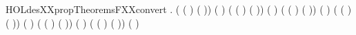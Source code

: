 \begin{SaveVerbatim}{HOLdesXXpropTheoremsFXXconvert}
\HOLTokenTurnstile{} \HOLSymConst{\HOLTokenForall{}} .
        \HOLSymConst{=}
     \HOLTokenLeftbrace{} \HOLTokenBar{}   \HOLSymConst{\HOLTokenEor{}}  ( \HOLSymConst{\HOLTokenEor{}} ( \HOLSymConst{\HOLTokenExtract{}} ) ( )) \HOLSymConst{=} ( \HOLSymConst{\HOLTokenExtract{}} ) \HOLTokenRightbrace{} \HOLConst{\ensuremath{\times}}
     \HOLTokenLeftbrace{} \HOLTokenBar{}   \HOLSymConst{\HOLTokenEor{}}  ( \HOLSymConst{\HOLTokenEor{}} ( \HOLSymConst{\HOLTokenExtract{}} ) ( )) \HOLSymConst{=} ( \HOLSymConst{\HOLTokenExtract{}} ) \HOLTokenRightbrace{} \HOLConst{\ensuremath{\times}}
     \HOLTokenLeftbrace{} \HOLTokenBar{}   \HOLSymConst{\HOLTokenEor{}}  ( \HOLSymConst{\HOLTokenEor{}} ( \HOLSymConst{\HOLTokenExtract{}} ) ( )) \HOLSymConst{=} ( \HOLSymConst{\HOLTokenExtract{}} ) \HOLTokenRightbrace{} \HOLConst{\ensuremath{\times}}
     \HOLTokenLeftbrace{} \HOLTokenBar{}   \HOLSymConst{\HOLTokenEor{}}  ( \HOLSymConst{\HOLTokenEor{}} ( \HOLSymConst{\HOLTokenExtract{}} ) ( )) \HOLSymConst{=} ( \HOLSymConst{\HOLTokenExtract{}} ) \HOLTokenRightbrace{} \HOLConst{\ensuremath{\times}}
     \HOLTokenLeftbrace{} \HOLTokenBar{}   \HOLSymConst{\HOLTokenEor{}}  ( \HOLSymConst{\HOLTokenEor{}} ( \HOLSymConst{\HOLTokenExtract{}} ) ( )) \HOLSymConst{=} ( \HOLSymConst{\HOLTokenExtract{}} ) \HOLTokenRightbrace{} \HOLConst{\ensuremath{\times}}
     \HOLTokenLeftbrace{} \HOLTokenBar{}   \HOLSymConst{\HOLTokenEor{}}  ( \HOLSymConst{\HOLTokenEor{}} ( \HOLSymConst{\HOLTokenExtract{}} ) ( )) \HOLSymConst{=} ( \HOLSymConst{\HOLTokenExtract{}} ) \HOLTokenRightbrace{} \HOLConst{\ensuremath{\times}}

\end{SaveVerbatim}
